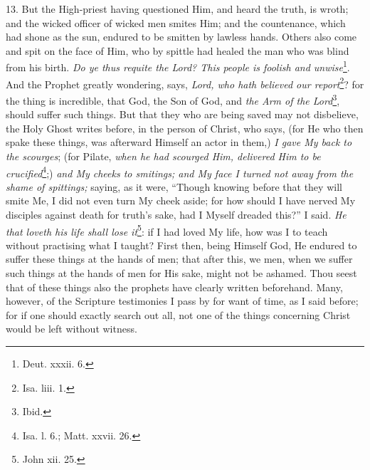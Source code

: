 13. But the High-priest having questioned Him, and heard the truth, is wroth; and the wicked officer of wicked men smites Him; and the countenance, which had shone as the sun, endured to be smitten by lawless hands. Others also come and spit on the face of Him, who by spittle had healed the man who was blind from his birth. \emph{Do ye thus requite the Lord? This people is foolish and unwise}\footnote{Deut. xxxii. 6.}. And the Prophet greatly wondering, says, \emph{Lord, who hath believed our report}\footnote{Isa. liii. 1.}? for the thing is incredible, that God, the Son of God, and \emph{the Arm of the Lord}\footnote{Ibid.}, should suffer such things. But that they who are being saved may not disbelieve, the Holy Ghost writes before, in the person of Christ, who says, (for He who then spake these things, was afterward Himself an actor in them,) \emph{I gave My back to the scourges}; (for Pilate, \emph{when he had scourged Him, delivered Him to be crucified}\footnote{Isa. l. 6.; Matt. xxvii. 26.};) \emph{and My cheeks to smitings; and My face I turned not away from the shame of spittings;} saying, as it were, “Though knowing before that they will smite Me, I did not even turn My cheek aside; for how should I have nerved My disciples against death for truth’s sake, had I Myself dreaded this?” I said. \emph{He that loveth his life shall lose it}\footnote{John xii. 25.}: if I had loved My life, how was I to teach without practising what I taught? First then, being Himself God, He endured to suffer these things at the hands of men; that after this, we men, when we suffer such things at the hands of men for His sake, might not be ashamed. Thou seest that of these things also the prophets have clearly written beforehand. Many, however, of the Scripture testimonies I pass by for want of time, as I said before; for if one should exactly search out all, not one of the things concerning Christ would be left without witness.

